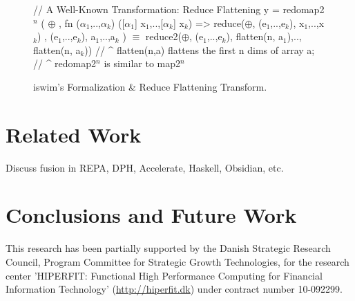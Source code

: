 \documentclass{sigplanconf}  %
\newcommand{\emp}[1]{\textcolor{DikuRed}{ #1}}
\newcommand{\emphh}[1]{\textcolor{CosGreen}{ #1}}
\newcommand{\mymath}[1]{$ #1 $}
\newcommand{\myindx}[1]{_{#1}}
\newcommand{\myindu}[1]{^{#1}}
\begin{document}
\begin{figure}[bt]
{\begin{colorcode}
// \emp{A Well-Known Transformation: Reduce Flattening}
y = redomap2\mymath{\myindu{n}} ( \mymath{\oplus} 
               , fn (\mymath{\alpha\myindx{1}},..,\mymath{\alpha\myindx{k}}) ([\mymath{\alpha\myindx{1}}] x\mymath{\myindx{1}},..,[\mymath{\alpha\myindx{k}}] x\mymath{\myindx{k}}) => 
                     reduce(\mymath{\oplus}, (e\mymath{\myindx{1}},..,e\mymath{\myindx{k}}), x\mymath{\myindx{1}},..,x\mymath{\myindx{k}})
               , (e\mymath{\myindx{1}},..,e\mymath{\myindx{k}}), a\mymath{\myindx{1}},..,a\mymath{\myindx{k}} )
        \emphh{\mymath{\equiv}}
reduce2(\mymath{\oplus}, (e\mymath{\myindx{1}},..,e\mymath{\myindx{k}}), flatten(n, a\mymath{\myindx{1}}),.., flatten(n, a\mymath{\myindx{k}}))
// ^ flatten(n,a) flattens the first n dims of array a;
// ^ redomap2\mymath{\myindu{n}} is similar to map2\mymath{\myindu{n}}
\end{colorcode}
} \vspace{-2ex}
\caption{{\sc iswim}'s Formalization \& Reduce Flattening Transform.}
\label{fig:TransfGen}
\end{figure}



\section{Related Work}
\label{sec:RelWork}

Discuss fusion in REPA, DPH, Accelerate, Haskell, Obsidian, etc.

\section{Conclusions and Future Work}
\label{sec:Concl}




%



\enlargethispage{\baselineskip}
\acks
This research has been partially supported by the Danish
Strategic Research Council, Program Committee for Strategic Growth
Technologies, for the research center 'HIPERFIT: Functional High
Performance Computing for Financial Information Technology'
(\url{http://hiperfit.dk}) under contract number 10-092299.
\end{document}
